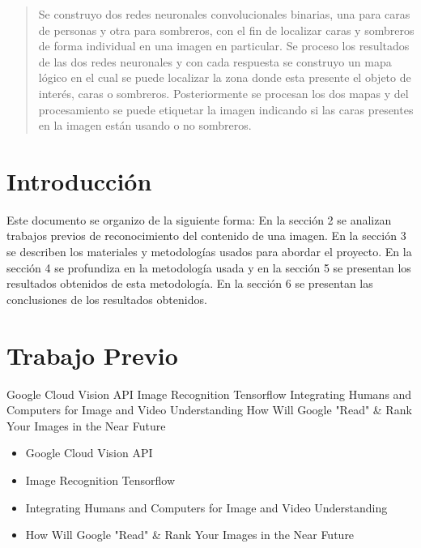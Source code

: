 \documentclass[10pt,twocolumn,letterpaper]{article}
\begin{document}

\begin{abstract}
Se construyo dos redes neuronales convolucionales binarias, una para caras de personas y otra para sombreros, con el fin de localizar caras y sombreros de forma individual en una imagen en particular. Se proceso los resultados de las dos redes neuronales y con cada respuesta se construyo un mapa lógico en el cual se puede localizar la zona donde esta presente el objeto de interés, caras o sombreros. Posteriormente se procesan los dos mapas y del procesamiento se puede etiquetar la imagen indicando si las caras presentes en la imagen están usando o no sombreros.
\end{abstract}

\section{Introducción}
Este documento se organizo de la siguiente forma: En la sección 2 se analizan trabajos previos de reconocimiento del contenido de una imagen. En la sección 3 se describen los materiales y metodologías usados para abordar el proyecto. En la sección 4 se profundiza en la metodología usada y en la sección 5 se presentan los resultados obtenidos de esta metodología. En la sección 6 se presentan las conclusiones de los resultados obtenidos.


\section{Trabajo Previo}

 
Google Cloud Vision API 
Image Recognition Tensorflow
Integrating Humans and Computers for Image and Video Understanding 
How Will Google "Read" \& Rank Your Images in the Near Future

\begin{itemize}
\item Google Cloud Vision API 
\item Image Recognition Tensorflow
\item Integrating Humans and Computers for Image and Video Understanding 
\item How Will Google "Read" \& Rank Your Images in the Near Future
\end{itemize}









\end{document}
